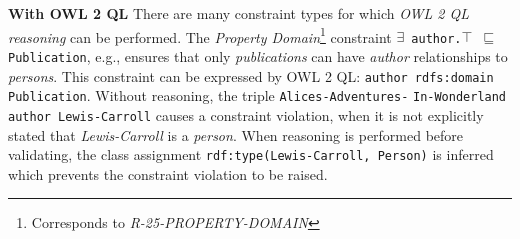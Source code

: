 \documentclass{llncs}
\newcommand{\ms}[1]{\texttt{#1}}
\newenvironment{DL}{
  \vspace{0cm}
  \begin{tabular}{r l}

}{
  \end{tabular}
}
\begin{document}
\textbf{With OWL 2 QL}
There are many constraint types for which {\em OWL 2 QL reasoning} can be performed. 
%
%
%
%
The {\em Property Domain}\footnote{Corresponds to {\em R-25-PROPERTY-DOMAIN}} constraint
\ms{$\exists$ author.$\top$ $\sqsubseteq$ Publication}, e.g., 
ensures that only \emph{publications} can have {\em author} relationships to \emph{persons}.
This constraint can be expressed by OWL 2 QL: \ms{author rdfs:domain Publication}.
Without reasoning, the triple \ms{Alices-Adventures-} \ms{In-Wonderland author Lewis-Carroll} causes a constraint violation, when it is not explicitly stated that \emph{Lewis-Carroll} is a \emph{person}. 
When reasoning is performed before validating, the class assignment \ms{rdf:type(Lewis-Carroll, Person)} is inferred which prevents the constraint violation to be raised.

%
%
\end{document}
